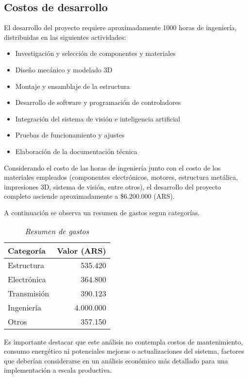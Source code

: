 \subsection{Costos de desarrollo}

El desarrollo del proyecto requiere aproximadamente 1000 horas de ingeniería, distribuidas en las siguientes actividades:

\begin{itemize}[label=$\bullet$]
    \item Investigación y selección de componentes y materiales
    \item Diseño mecánico y modelado 3D
    \item Montaje y ensamblaje de la estructura
    \item Desarrollo de software y programación de controladores
    \item Integración del sistema de visión e inteligencia artificial
    \item Pruebas de funcionamiento y ajustes
    \item Elaboración de la documentación técnica
\end{itemize}

Considerando el costo de las horas de ingeniería junto con el costo de los materiales empleados (componentes electrónicos, motores, estructura metálica, impresiones 3D, sistema de visión, entre otros), el desarrollo del proyecto completo asciende aproximadamente a \$6.200.000 (ARS).

A continuación se observa un resumen de gastos segun categorías.

\begin{table}[h]
\centering
\begin{tabular}{|l|r|}
\hline
\textbf{Categoría} & \textbf{Valor (ARS)} \\
\hline
Estructura & 535.420 \\
\hline
Electrónica & 364.800 \\
\hline
Transmisión & 390.123 \\
\hline
Ingeniería & 4.000.000 \\
\hline
Otros & 357.150 \\
\hline
\end{tabular}
\caption{\textit{Resumen de gastos}}
\end{table}

Es importante destacar que este análisis no contempla costos de mantenimiento, consumo energético ni potenciales mejoras o actualizaciones del sistema, factores que deberían considerarse en un análisis económico más detallado para una implementación a escala productiva.

